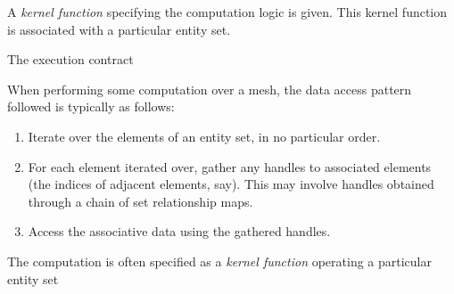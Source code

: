 A \emph{kernel function} specifying the computation logic is given. This kernel function is associated with a particular entity set.

The execution contract

When performing some computation over a mesh, the data access pattern followed is typically as follows:
\begin{enumerate}
\item Iterate over the elements of an entity set, in no particular order.
\item For each element iterated over, gather any handles to associated elements (the indices of adjacent elements, say). This may involve handles obtained through a chain of set relationship maps.
\item Access the associative data using the gathered handles.
\end{enumerate}


 The computation is often specified as a \emph{kernel function} operating a particular entity set

